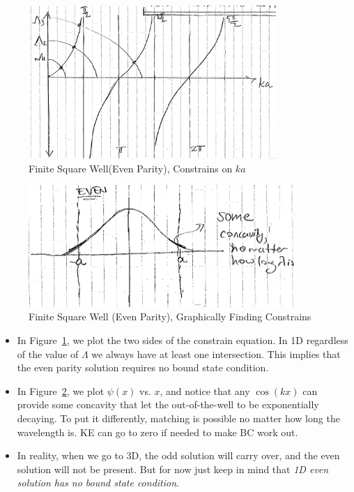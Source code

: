 \documentclass{school-22.101-notes}
\begin{document}
\begin{figure}[h!]
    \centering
    \includegraphics[width=3.7in]{images/qm/FSW-even-graph-ka.png}
    \caption{Finite Square Well(Even Parity), Constrains on $ka$}
    \label{FSW-even-graph-ka}
\end{figure}
\begin{figure}[h!]
    \centering
    \includegraphics[width=4in]{images/qm/FSW-even-graph-psi.png}
    \caption{Finite Square Well (Even Parity), Graphically Finding Constrains}
    \label{FSW-even-graph-psi}
\end{figure}

\begin{itemize}
\item In Figure~\ref{FSW-even-graph-ka}, we plot the two sides of the constrain equation. In 1D regardless of the value of $\Lambda$ we always have at least one intersection. This implies that the even parity solution requires no bound state condition. 

\item In Figure~\ref{FSW-even-graph-psi}, we plot $\psi(x)$ vs. $x$, and notice that any $\cos(kx)$ can provide some concavity that let the out-of-the-well to be exponentially decaying. To put it differently, matching is possible no matter how long the wavelength is. KE can go to zero if needed to make BC work out. 

\item In reality, when we go to 3D, the odd solution will carry over, and the even solution will not be present. But for now just keep in mind that \textit{1D even solution has no bound state condition}. 
\end{itemize}
\end{document}
